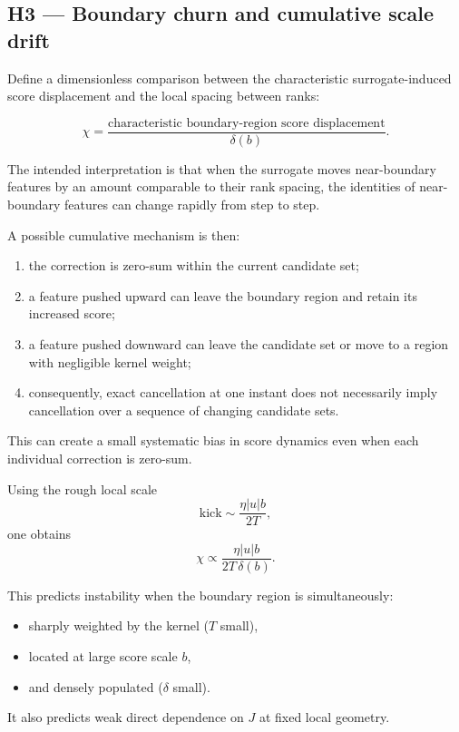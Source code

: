 \documentclass[11pt,a4paper]{article}
\begin{document}
\subsection*{H3 --- Boundary churn and cumulative scale drift}

Define a dimensionless comparison between the characteristic surrogate-induced
score displacement and the local spacing between ranks:

\[
\chi
=
\frac{
\text{characteristic boundary-region score displacement}
}{
\delta(b)
}.
\]

The intended interpretation is that when the surrogate moves near-boundary
features by an amount comparable to their rank spacing, the identities of
near-boundary features can change rapidly from step to step.

A possible cumulative mechanism is then:

\begin{enumerate}[leftmargin=1.6em]
    \item the correction is zero-sum within the current candidate set;
    \item a feature pushed upward can leave the boundary region and retain its
    increased score;
    \item a feature pushed downward can leave the candidate set or move to a
    region with negligible kernel weight;
    \item consequently, exact cancellation at one instant does not necessarily
    imply cancellation over a sequence of changing candidate sets.
\end{enumerate}

This can create a small systematic bias in score dynamics even when each
individual correction is zero-sum.

Using the rough local scale
\[
\text{kick}
\sim
\frac{\eta |u| b}{2T},
\]
one obtains
\[
\chi
\propto
\frac{\eta |u| b}{2T\,\delta(b)}.
\]

This predicts instability when the boundary region is simultaneously:
\begin{itemize}[leftmargin=1.4em]
    \item sharply weighted by the kernel (\(T\) small),
    \item located at large score scale \(b\),
    \item and densely populated (\(\delta\) small).
\end{itemize}

It also predicts weak direct dependence on \(J\) at fixed local geometry.
\end{document}
